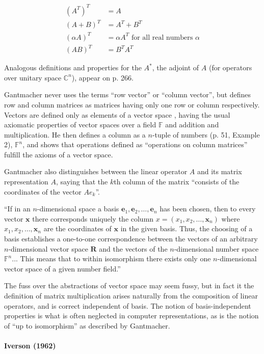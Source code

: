 \begin{align}
(A^T)^T & = A \\
(A + B)^T & = A^T + B^T \\
(\alpha A)^T & = \alpha A^T \textrm{ for all real numbers } \alpha \\
(A B)^T & = B^T A^T
\end{align}

Analogous definitions and properties for the $A^*$, the adjoint of $A$ (for operators over unitary space $\mathbb C^n$), appear on p. 266.

Gantmacher never uses the terms ``row vector'' or ``column vector'', but defines row and column matrices as matrices having only one row or column respectively. Vectors are defined only as elements of a vector space \cite[p. 51]{Gantmacher1960}, having the usual axiomatic properties of vector spaces over a field $\mathbb F$ and addition and multiplication. He then defines a column as a $n$-tuple of numbers (p. 51, Example 2), $\mathbb F^n$, and shows that operations defined as ``operations on column matrices'' fulfill the axioms of a vector space.

Gantmacher also distinguishes \cite[pp. 54-56]{Gantmacher1960} between the linear operator $A$ and its matrix representation $A$, saying that the $k$th column of the matrix ``consists of the coordinates of the vector $Ae_k$''.

``If in an $n$-dimensional space a basis $\mathbf e_1, \mathbf e_2, \dots, \mathbf e_n$ has been chosen, then to every vector $\mathbf x$ there corresponds uniquely the column $x = (x_1, x_2, \dots, \mathbf x_n)$ where $x_1, x_2, \dots, \mathbf x_n$ are the coordinates of $\mathbf x$ in the given basis. Thus, the choosing of a basis establishes a one-to-one correspondence between the vectors of an arbitrary $n$-dimensional vector space $\mathbf R$ and the vectors of the $n$-dimensional number space $\mathbb F^n$... This means that to within isomorphism there exists only one $n$-dimensional vector space of a given number field.''

The fuss over the abstractions of vector space may seem fussy, but in fact it the definition of matrix multiplication arises naturally from the composition of linear operators, and is correct independent of basis. The notion of basis-independent properties is what is often neglected in computer representations, as is the notion of ``up to isomorphism'' as described by Gantmacher.



\paragraph{Iverson (1962)~\cite{Iverson1962}}

